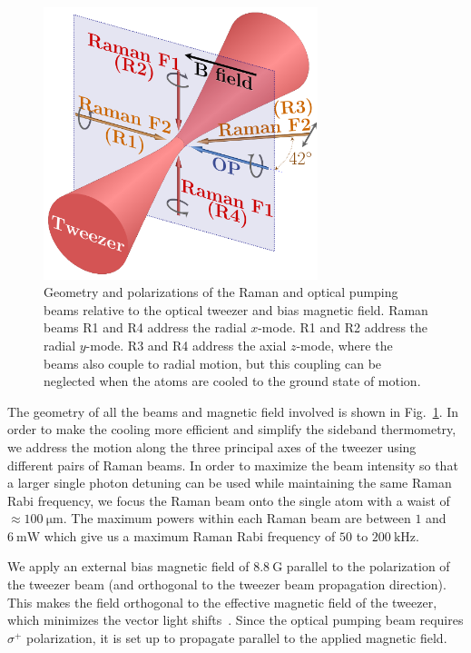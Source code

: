 \begin{figure}
  \centering
  \includegraphics[width=8cm]{figures/na_rsc_geometry.pdf}
  \caption[Beams and field geometry for Sodium Raman sideband cooling]{
    Geometry and polarizations of the Raman and optical pumping beams relative to the
    optical tweezer and bias magnetic field.
    Raman beams R1 and R4 address the radial $x$-mode.
    R1 and R2 address the radial $y$-mode.
    R3 and R4 address the axial $z$-mode, where the beams also couple to radial motion,
    but this coupling can be neglected when the atoms are cooled to the ground state of motion.
    \label{fig:rsc:na-geometry}}
\end{figure}

The geometry of all the beams and magnetic field involved
is shown in Fig.~\ref{fig:rsc:na-geometry}.
In order to make the cooling more efficient and simplify the sideband thermometry,
we address the motion along the three principal axes of the tweezer using different pairs
of Raman beams.
In order to maximize the beam intensity so that a larger single photon detuning can be used
while maintaining the same Raman Rabi frequency,
we focus the Raman beam onto the single atom with a waist of $\approx\!100~\mathrm{\mu m}$.
The maximum powers within each Raman beam are between $1$ and $6~\mathrm{mW}$
which give us a maximum Raman Rabi frequency of $50$ to $200~\mathrm{kHz}$.

We apply an external bias magnetic field of $8.8~\mathrm{G}$ parallel to the polarization
of the tweezer beam (and orthogonal to the tweezer beam propagation direction).
This makes the field orthogonal to the effective magnetic field of the tweezer,
which minimizes the vector light shifts~\cite{kaufman_cooling_2012,thompson_coherence_2013}.
Since the optical pumping beam requires $\sigma^+$ polarization,
it is set up to propagate parallel to the applied magnetic field.

